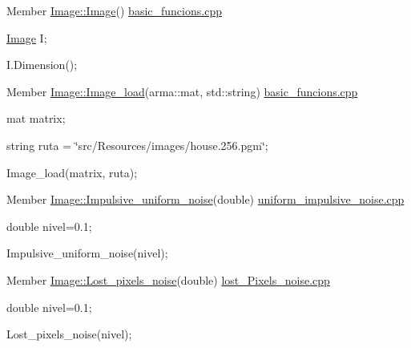 \label{test__test000003}
\hypertarget{test__test000003}{}
 
\begin{DoxyDescription}
\item[Member \hyperlink{classImage_a58edd1c45b4faeb5f789b0d036d02313}{Image::Image}() ]\hyperlink{basic__funcions_8cpp}{basic\_\-funcions.cpp} \par
 \hyperlink{classImage}{Image} I; \par
 I.Dimension(); 
\end{DoxyDescription}

\label{test__test000002}
\hypertarget{test__test000002}{}
 
\begin{DoxyDescription}
\item[Member \hyperlink{classImage_adc137bf8699177ff23598709300ab091}{Image::Image\_\-load}(arma::mat, std::string) ]\hyperlink{basic__funcions_8cpp}{basic\_\-funcions.cpp} \par
 mat matrix; \par
 string ruta = \char`\"{}src/Resources/images/house.256.pgm\char`\"{}; \par
 Image\_\-load(matrix, ruta); 
\end{DoxyDescription}

\label{test__test000012}
\hypertarget{test__test000012}{}
 
\begin{DoxyDescription}
\item[Member \hyperlink{classImage_ac33563552d3b003151122a2070e39540}{Image::Impulsive\_\-uniform\_\-noise}(double) ]\hyperlink{uniform__impulsive__noise_8cpp}{uniform\_\-impulsive\_\-noise.cpp} \par
 double nivel=0.1; \par
 Impulsive\_\-uniform\_\-noise(nivel); 
\end{DoxyDescription}

\label{test__test000010}
\hypertarget{test__test000010}{}
 
\begin{DoxyDescription}
\item[Member \hyperlink{classImage_a7f129688b13d0d5e75d3c524fcd1e6bb}{Image::Lost\_\-pixels\_\-noise}(double) ]\hyperlink{lost__Pixels__noise_8cpp}{lost\_\-Pixels\_\-noise.cpp} \par
 double nivel=0.1; \par
 Lost\_\-pixels\_\-noise(nivel); 
\end{DoxyDescription}

\label{test__test000019}
\hypertarget{test__test000019}{}
 
